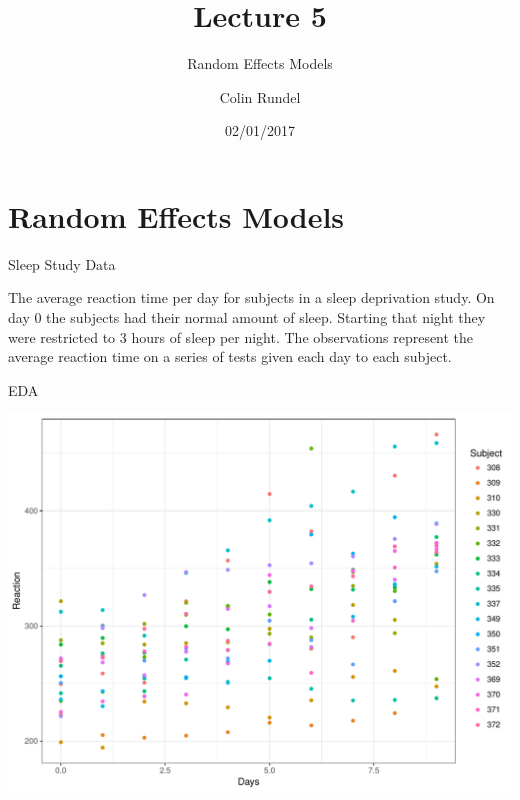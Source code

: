 \documentclass[11pt,ignorenonframetext,]{beamer}
\title{Lecture 5}
\subtitle{Random Effects Models}
\author{Colin Rundel}
\date{02/01/2017}
\newenvironment{Shaded}{}{}
\newcommand{\KeywordTok}[1]{\textcolor[rgb]{0.00,0.44,0.13}{\textbf{#1}}}
\newcommand{\StringTok}[1]{\textcolor[rgb]{0.25,0.44,0.63}{#1}}
\newcommand{\OperatorTok}[1]{\textcolor[rgb]{0.40,0.40,0.40}{#1}}
\newcommand{\NormalTok}[1]{#1}
\let\oldShaded\Shaded
\let\endoldShaded\endShaded
\renewenvironment{Shaded}{\footnotesize\begin{spacing}{0.9}\oldShaded}{\endoldShaded\end{spacing}}
\begin{document}
\frame{\titlepage}

\section{Random Effects Models}\label{random-effects-models}

\begin{frame}[fragile]{Sleep Study Data}

\small
The average reaction time per day for subjects in a sleep deprivation
study. On day 0 the subjects had their normal amount of sleep. Starting
that night they were restricted to 3 hours of sleep per night. The
observations represent the average reaction time on a series of tests
given each day to each subject.

\begin{Shaded}
\end{Shaded}

\end{frame}

\begin{frame}{EDA}

\includegraphics{Lec5_files/figure-beamer/unnamed-chunk-2-1.pdf}

\end{frame}
\end{document}
